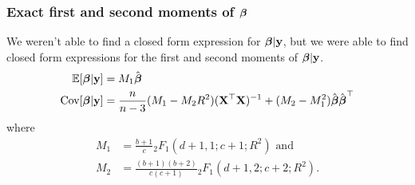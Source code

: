\documentclass[notes=only]{beamer}
\begin{document}

\begin{frame}
	\frametitle{Exact first and second moments of ${\boldsymbol \beta}$}
	We weren't able to find a closed form expression for ${\boldsymbol \beta} | {\bf y}$, but we were able to find closed form
	expressions for the first and second moments of ${\boldsymbol \beta} | {\bf y}$.
	\small
	\begin{align*}
		\mathbb{E}[{\boldsymbol \beta} | {\bf y}] &= M_1 \hat{{\boldsymbol \beta}} \\
		\mbox{Cov}[{\boldsymbol \beta} | {\bf y}] &= \frac{n}{n - 3} (M_1 - M_2 R^2)({\bf X}^\top {\bf X})^{-1} + (M_2 - M_1^2) \hat{{\boldsymbol \beta}} \hat{{\boldsymbol \beta}}^\top
	\end{align*}
	where
	\small
	\begin{align*}
		M_1 &= \frac{b + 1}{c} {}_2 F_1 (d + 1, 1; c + 1; R^2) \text{ and } \\
		M_2 &= \frac{(b + 1)(b + 2)}{c(c + 1)} {}_2 F_1 (d + 1, 2; c + 2; R^2).
	\end{align*}
\end{frame}


\end{document}
